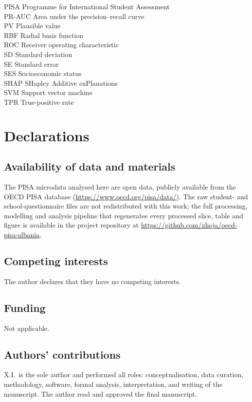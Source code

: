 \documentclass[11pt,a4paper]{article}
\begin{document}
\begin{tabbing}
PISA \> Programme for International Student Assessment\\
PR-AUC \> Area under the precision--recall curve\\
PV \> Plausible value\\
RBF \> Radial basis function\\
ROC \> Receiver operating characteristic\\
SD \> Standard deviation\\
SE \> Standard error\\
SES \> Socioeconomic status\\
SHAP \> SHapley Additive exPlanations\\
SVM \> Support vector machine\\
TPR \> True-positive rate\\
\end{tabbing}
\endgroup
\linenumbers

\section*{Declarations}

\subsection*{Availability of data and materials}
The PISA microdata analysed here are open data, publicly available from the OECD PISA
database (\url{https://www.oecd.org/pisa/data/}). The raw student- and
school-questionnaire files are not redistributed with this work; the full processing,
modelling and analysis pipeline that regenerates every processed slice, table and figure
is available in the project repository at
\url{https://github.com/xhoja/oecd-pisa-albania}.

\subsection*{Competing interests}
The author declares that they have no competing interests.

\subsection*{Funding}
Not applicable.

\subsection*{Authors' contributions}
X.I.\ is the sole author and performed all roles: conceptualisation, data curation,
methodology, software, formal analysis, interpretation, and writing of the manuscript.
The author read and approved the final manuscript.
\end{document}
